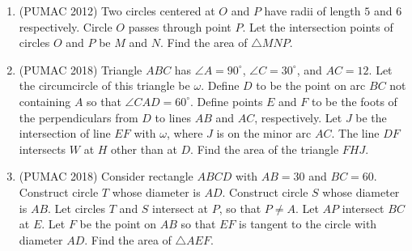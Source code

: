 \documentclass[12pt]{scrartcl}
\begin{document}
\begin{enumerate}
    \item (PUMAC 2012) Two circles centered at $O$ and $P$ have radii of length $5$ and $6$ respectively. Circle $O$ passes through point $P$. Let the intersection points of circles $O$ and $P$ be $M$ and $N$. Find the area of $\triangle MNP$.


    \item (PUMAC 2018) Triangle $ABC$ has $\angle A = 90^\circ$, $\angle C = 30^\circ$, and $AC = 12$. Let the circumcircle of this triangle be $\omega$. Define $D$ to be the point on arc $BC$ not containing $A$ so that $\angle CAD = 60^\circ$. Define points $E$ and $F$ to be the foots of the perpendiculars from $D$ to lines $AB$ and $AC$, respectively. Let $J$ be the intersection of line $EF$ with $\omega$, where $J$ is on the minor arc $AC$. The line $DF$ intersects $W$ at $H$ other than at $D$. Find the area of the triangle $FHJ$.


    \item (PUMAC 2018) Consider rectangle $ABCD$ with $AB = 30$ and $BC = 60$. Construct circle $T$ whose diameter is $AD$. Construct circle $S$ whose diameter is $AB$. Let circles $T$ and $S$ intersect at $P$, so that $P \neq A$. Let $AP$ intersect $BC$ at $E$. Let $F$ be the point on $AB$ so that $EF$ is tangent to the circle with diameter $AD$. Find the area of $\triangle AEF$.
\end{enumerate}
\end{document}

